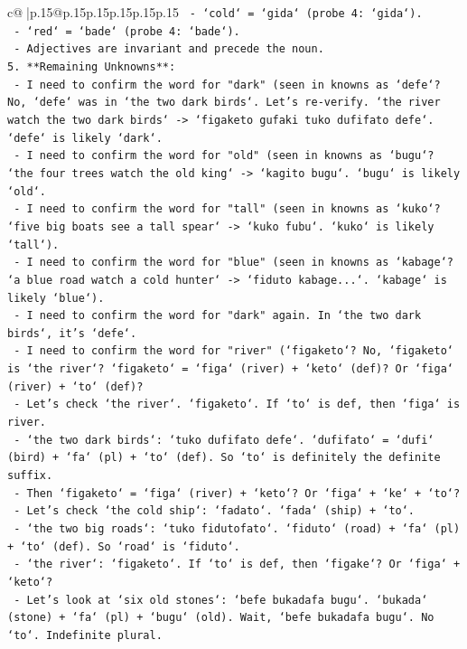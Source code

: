 \documentclass{article}
\begin{document}
{\begin{supertabular}{c@{$\;$}|p{.15\linewidth}@{}p{.15\linewidth}p{.15\linewidth}p{.15\linewidth}p{.15\linewidth}p{.15\linewidth}}
{{{\texttt{   {-} `cold` = `gida` (probe 4: `gida`).} \\
\texttt{   {-} `red` = `bade` (probe 4: `bade`).} \\
\texttt{   {-} Adjectives are invariant and precede the noun.} \\
\texttt{5. **Remaining Unknowns**:} \\
\texttt{   {-} I need to confirm the word for "dark" (seen in knowns as `defe`? No, `defe` was in `the two dark birds`. Let's re{-}verify. `the river watch the two dark birds` {-}> `figaketo gufaki tuko dufifato defe`. `defe` is likely `dark`.} \\
\texttt{   {-} I need to confirm the word for "old" (seen in knowns as `bugu`? `the four trees watch the old king` {-}> `kagito bugu`. `bugu` is likely `old`.} \\
\texttt{   {-} I need to confirm the word for "tall" (seen in knowns as `kuko`? `five big boats see a tall spear` {-}> `kuko fubu`. `kuko` is likely `tall`).} \\
\texttt{   {-} I need to confirm the word for "blue" (seen in knowns as `kabage`? `a blue road watch a cold hunter` {-}> `fiduto kabage...`. `kabage` is likely `blue`).} \\
\texttt{   {-} I need to confirm the word for "dark" again. In `the two dark birds`, it's `defe`.} \\
\texttt{   {-} I need to confirm the word for "river" (`figaketo`? No, `figaketo` is `the river`? `figaketo` = `figa` (river) + `keto` (def)? Or `figa` (river) + `to` (def)?} \\
\texttt{     {-} Let's check `the river`. `figaketo`. If `to` is def, then `figa` is river.} \\
\texttt{     {-} `the two dark birds`: `tuko dufifato defe`. `dufifato` = `dufi` (bird) + `fa` (pl) + `to` (def). So `to` is definitely the definite suffix.} \\
\texttt{     {-} Then `figaketo` = `figa` (river) + `keto`? Or `figa` + `ke` + `to`?} \\
\texttt{     {-} Let's check `the cold ship`: `fadato`. `fada` (ship) + `to`.} \\
\texttt{     {-} `the two big roads`: `tuko fidutofato`. `fiduto` (road) + `fa` (pl) + `to` (def). So `road` is `fiduto`.} \\
\texttt{     {-} `the river`: `figaketo`. If `to` is def, then `figake`? Or `figa` + `keto`?} \\
\texttt{     {-} Let's look at `six old stones`: `befe bukadafa bugu`. `bukada` (stone) + `fa` (pl) + `bugu` (old). Wait, `befe bukadafa bugu`. No `to`. Indefinite plural.} \\
}}}
\end{supertabular}}
\end{document}
